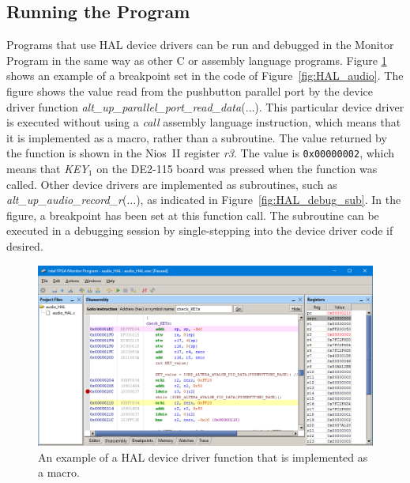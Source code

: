 \documentclass[11pt, twoside, pdftex]{article}
\begin{document}
\subsection{Running the Program}

Programs that use HAL device drivers can be run and debugged in the Monitor Program in the same way as other C or 
assembly language programs. Figure \ref{fig:HAL_debug} shows an example of a breakpoint set in the code 
of Figure~\ref{fig:HAL_audio}. The figure shows
the value read from the pushbutton parallel port by the device driver function {\it
alt\_up\_parallel\_port\_read\_data}($\ldots$). This particular device driver is executed without using a {\it call}
assembly language instruction, which means that it is implemented as a macro, rather than a subroutine. The value 
returned by the function is shown in the Nios~II register {\it r3}. The value is \texttt{0x00000002}, which means 
that {\it KEY}$_1$ on the DE2-115 board was pressed when the function was called. Other device drivers are implemented as 
subroutines, such as {\it alt\_up\_audio\_record\_r}($\ldots$), as indicated in Figure~\ref{fig:HAL_debug_sub}. In
the figure, a breakpoint has been set at this function call. The subroutine can be executed in a debugging session 
by single-stepping into the device driver code if desired.

\begin{figure}[h!]
	\begin{center}
		\includegraphics[width=5.75in]{figures/HAL_debug.png}
	\end{center}
	\caption{An example of a HAL device driver function that is implemented as a macro.} 
	\label{fig:HAL_debug}
\end{figure}
\end{document}
